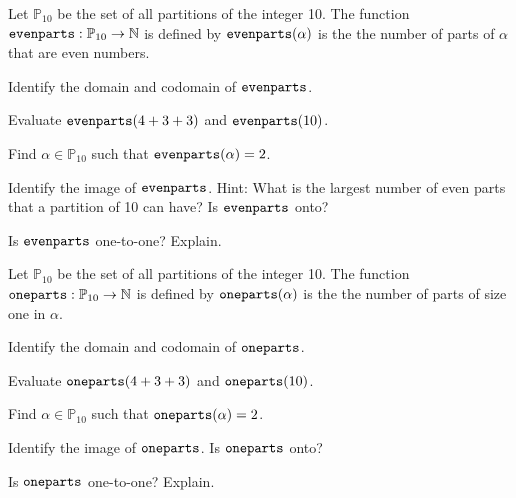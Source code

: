 \begin{exer}[\exerU] %
\label{exer_even_parts_fn}
    Let $\mathbb{P}_{10}$ be the set of all partitions of the integer 10. The function $\texttt{evenparts}:\mathbb{P}_{10} \to \mathbb{N}$ is defined by $\texttt{evenparts}(\alpha)$ is the the number of parts of $\alpha$ that are even numbers. 
        \begin{exerpart} 
            \item Identify the domain and codomain of $\texttt{evenparts}$.
            \item Evaluate $\texttt{evenparts}(4+3+3)$ and $\texttt{evenparts}(10)$.
            \item Find $\alpha \in \mathbb{P}_{10}$ such that  $\texttt{evenparts}(\alpha)=2$.
            \item Identify the image of $\texttt{evenparts}$. Hint: What is the largest number of even parts that a partition of 10 can have?  Is $\texttt{evenparts}$ onto?
            \item Is $\texttt{evenparts}$ one-to-one? Explain.
        \end{exerpart}
\end{exer}

\begin{exer}[\exerU] %
\label{exer_one_parts_fn}
    Let $\mathbb{P}_{10}$ be the set of all partitions of the integer 10. The function $\texttt{oneparts}:\mathbb{P}_{10} \to \mathbb{N}$ is defined by $\texttt{oneparts}(\alpha)$ is the the number of parts of size one in $\alpha$. 
        \begin{exerpart} 
            \item Identify the domain and codomain of $\texttt{oneparts}$.
            \item Evaluate $\texttt{oneparts}(4+3+3)$ and $\texttt{oneparts}(10)$.
            \item Find $\alpha \in \mathbb{P}_{10}$ such that  $\texttt{oneparts}(\alpha)=2$.
            \item Identify the image of $\texttt{oneparts}$. Is $\texttt{oneparts}$ onto?
            \item Is $\texttt{oneparts}$ one-to-one? Explain.
        \end{exerpart}
\end{exer}

